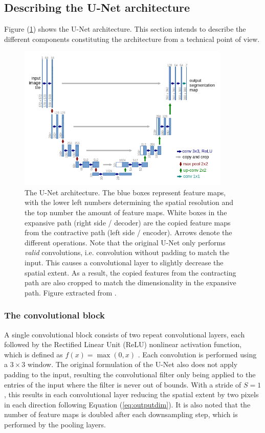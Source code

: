 \documentclass[../main/thesis.tex]{subfiles}
\begin{document}
\subsection{Describing the U-Net architecture}
Figure (\ref{fig:unet-overview}) shows the U-Net architecture. This section intends to describe the different components constituting the architecture from a technical point of view. 

\begin{figure}
    \centering
    \includegraphics[width=0.9\textwidth]{unet_screenshot}
    \caption{\label{fig:unet-overview}The U-Net architecture. The blue boxes represent feature maps, with the lower left numbers determining the spatial resolution and the top number the amount of feature maps. White boxes in the expansive path (right side / decoder) are the copied feature maps from the contractive path (left side / encoder). Arrows denote the different operations. Note that the original U-Net only performs \textit{valid} convolutions, i.e. convolution without padding to match the input. This causes a convolutional layer to slightly decrease the spatial extent. As a result, the copied features from the contracting path are also cropped to match the dimensionality in the expansive path. Figure extracted from \protect\citet{Ronneberger2015}.}
\end{figure}

\subsubsection{The convolutional block}
A single convolutional block consists of two repeat convolutional layers, each followed by the Rectified Linear Unit (ReLU) nonlinear activation function, which is defined as $f(x) = \max{(0,x)}$ \citep{Nair2010}. Each convolution is performed using a $3 \times 3$ window. The original formulation of the U-Net also does not apply padding to the input, resulting the convolutional filter only being applied to the entries of the input where the filter is never out of bounds. With a stride of $S=1$, this results in each convolutional layer reducing the spatial extent by two pixels in each direction following Equation (\ref{eq:outputdim}). It is also noted that the number of feature maps is doubled after each downsampling step, which is performed by the pooling layers.
\end{document}
